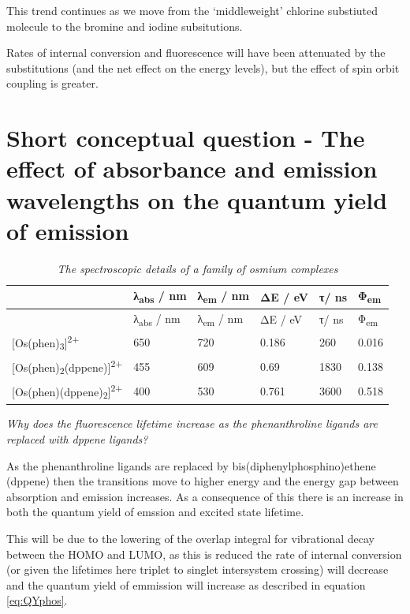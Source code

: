 \documentclass[
]{book}
\begin{document}
This trend continues as we move from the `middleweight' chlorine substiuted molecule to the bromine and iodine subsitutions.

Rates of internal conversion and fluorescence will have been attenuated by the substitutions (and the net effect on the energy levels), but the effect of spin orbit coupling is greater.

\hypertarget{sec:osphen}{%
\section{Short conceptual question - The effect of absorbance and emission wavelengths on the quantum yield of emission}\label{sec:osphen}}

\begin{longtable}[]{@{}llllll@{}}
\caption{\label{tab:osphen} \emph{The spectroscopic details of a family of osmium complexes}}\tabularnewline
\toprule
& λ\textsubscript{abs} / nm & λ\textsubscript{em} / nm & ΔE / eV & τ/ ns & Φ\textsubscript{em}\tabularnewline
\midrule
\endfirsthead
\toprule
& λ\textsubscript{abs} / nm & λ\textsubscript{em} / nm & ΔE / eV & τ/ ns & Φ\textsubscript{em}\tabularnewline
\midrule
\endhead
{[}Os(phen)\textsubscript{3}{]}\textsuperscript{2+} & 650 & 720 & 0.186 & 260 & 0.016\tabularnewline
{[}Os(phen)\textsubscript{2}(dppene){]}\textsuperscript{2+} & 455 & 609 & 0.69 & 1830 & 0.138\tabularnewline
{[}Os(phen)(dppene)\textsubscript{2}{]}\textsuperscript{2+} & 400 & 530 & 0.761 & 3600 & 0.518\tabularnewline
\bottomrule
\end{longtable}

\emph{Why does the fluorescence lifetime increase as the phenanthroline ligands are replaced with dppene ligands?}

As the phenanthroline ligands are replaced by bis(diphenylphosphino)ethene (dppene) then the transitions move to higher energy and the energy gap between absorption and emission increases. As a consequence of this there is an increase in both the quantum yield of emssion and excited state lifetime.

This will be due to the lowering of the overlap integral for vibrational decay between the HOMO and LUMO, as this is reduced the rate of internal conversion (or given the lifetimes here triplet to singlet intersystem crossing) will decrease and the quantum yield of emmission will increase as described in equation \eqref{eq:QYphos}.

  
\end{document}

